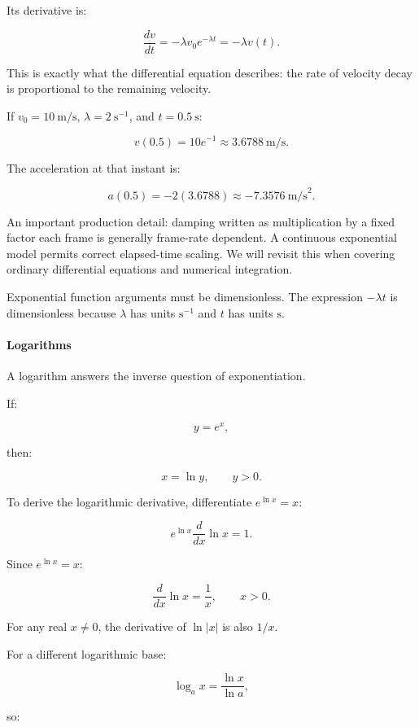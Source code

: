 Its derivative is:

\[
\frac{dv}{dt}=-\lambda v_0e^{-\lambda t} =-\lambda v(t).
\]

This is exactly what the differential equation describes: the rate of velocity decay is proportional to the remaining velocity.

If \(v_0=10\ \text{m/s}\), \(\lambda=2\ \mathrm{s}^{-1}\), and \(t=0.5\ \text{s}\):

\[
v(0.5)=10e^{-1}\approx3.6788\ \text{m/s}.
\]

The acceleration at that instant is:

\[
a(0.5)=-2(3.6788)\approx-7.3576\ \text{m/s}^2.
\]

An important production detail: damping written as multiplication by a fixed factor each frame is generally frame-rate dependent. A continuous exponential model permits correct elapsed-time scaling. We will revisit this when covering ordinary differential equations and numerical integration.

Exponential function arguments must be dimensionless. The expression \(-\lambda t\) is dimensionless because \(\lambda\) has units \(\mathrm{s}^{-1}\) and \(t\) has units \(\mathrm{s}\).

\paragraph{Logarithms}\label{01-foundations-i-ch020-logarithms}

\hypertarget{01-foundations-i-ch020-logarithms}{}

A logarithm answers the inverse question of exponentiation.

If:

\[
y=e^x,
\]

then:

\[
x=\ln y,\qquad y>0.
\]

To derive the logarithmic derivative, differentiate \(e^{\ln x}=x\):

\[
e^{\ln x}\frac d{dx}\ln x=1.
\]

Since \(e^{\ln x}=x\):

\[
\boxed{\frac d{dx}\ln x=\frac1x},\qquad x>0.
\]

For any real \(x\ne0\), the derivative of \(\ln|x|\) is also \(1/x\).

For a different logarithmic base:

\[
\log_a x=\frac{\ln x}{\ln a},
\]

so:

